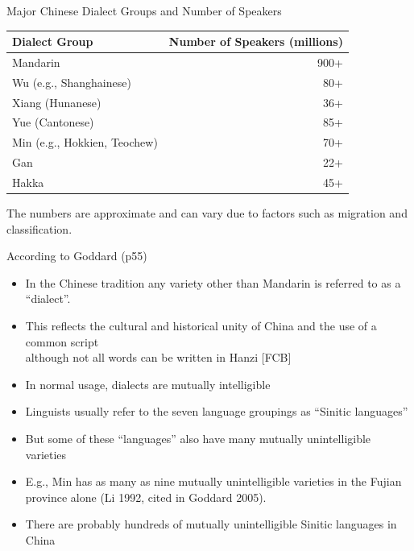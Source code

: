 \documentclass{beamer}
\begin{document}
\begin{frame}{Major Chinese Dialect Groups and Number of Speakers}
  \begin{center}
\begin{tabular}{lr}
\hline
\textbf{Dialect Group} & \textbf{Number of Speakers (millions)} \\ \hline
Mandarin & 900+ \\ \hline
Wu (e.g., Shanghainese) & 80+ \\ \hline
Xiang (Hunanese) & 36+ \\ \hline
Yue (Cantonese) & 85+ \\ \hline
Min (e.g., Hokkien, Teochew) & 70+ \\ \hline
Gan & 22+ \\ \hline
Hakka & 45+ \\ \hline
\end{tabular}

\end{center}

The numbers are approximate and can vary due to factors such as migration and classification. 
\end{frame}

\begin{frame}
  According to Goddard (p55)
  \begin{itemize}
  \item In the Chinese tradition any variety other than Mandarin is referred to as a ``dialect''. 
  \item This reﬂects the cultural and historical unity of China and the use of a common script
    \\ although not all words can be written in Hanzi [FCB]
\item In normal usage, dialects are mutually intelligible
\item  Linguists usually refer to the seven language groupings  as ``Sinitic languages''
\item But  some of these ``languages'' also have many mutually unintelligible varieties
\item E.g.,  Min has as many as  nine mutually unintelligible varieties in the Fujian province alone
(Li 1992, cited in Goddard 2005). 
\item There are probably hundreds of mutually unintelligible  Sinitic
languages in China
\end{itemize}
\end{frame}
\end{document}
